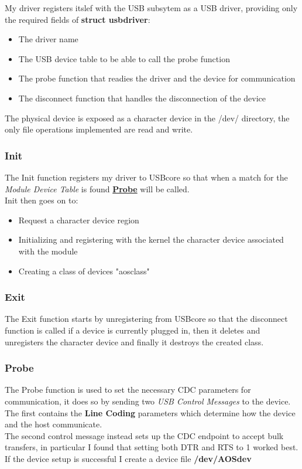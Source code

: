 \documentclass[10pt,a4]{article}
\begin{document}
My driver registers itslef with the USB subsytem as a USB driver, providing only the required fields of \textbf{struct usb\textunderscore driver}:
\begin{itemize}
	\item The driver name
	\item The USB device table to be able to call the probe function
	\item The probe function that readies the driver and the device for communication
	\item The disconnect function that handles the disconnection of the device
\end{itemize}
The physical device is exposed as a character device in the /dev/ directory, the only file operations implemented are read and write.
\subsubsection{Init}
The Init function registers my driver to USBcore so that when a match for the \textit{Module Device Table} is found \hyperref[sec:probe]{\textbf{Probe}} will be called.\\
Init then goes on to: \begin{itemize}
	\item Request a character device region 
	\item Initializing and registering with the kernel the character device associated with the module
	\item Creating a class of devices "aos\textunderscore class"
\end{itemize}
\subsubsection{Exit}
The Exit function starts by unregistering from USBcore so that the disconnect function is called if a device is currently plugged in, then it deletes and unregisters the character device and finally it destroys the created class.
\subsubsection{Probe}
\label{sec:probe}
The Probe function is used to set the necessary CDC parameters for communication, it does so by sending two \textit{USB Control Messages} to the device.\\The first contains the \textbf{Line Coding} parameters which determine how the device and the host communicate.\\The second control message instead sets up the CDC endpoint to accept bulk transfers, in particular I found that setting both DTR and RTS to 1 worked best.\\
If the device setup is successful I create a device file \textbf{/dev/AOSdev}
\end{document}
